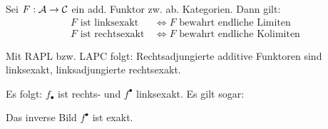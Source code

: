 \documentclass{cheat-sheet}
\begin{document}

\begin{lem}
  Sei $F : \mathcal{A} \to \mathcal{C}$ ein add. Funktor zw. ab. Kategorien. Dann gilt:
  \begin{align*}
    \text{$F$ ist linksexakt} & \, \iff \text{$F$ bewahrt endliche Limiten} \\
    \text{$F$ ist rechtsexakt} & \, \iff \text{$F$ bewahrt endliche Kolimiten}
  \end{align*}
\end{lem}

\begin{kor}
  Mit RAPL bzw. LAPC folgt: Rechtsadjungierte additive Funktoren sind linksexakt, linksadjungierte rechtsexakt.
\end{kor}

\begin{bem}
  Es folgt: $f_\bullet$ ist rechts- und $f^\bullet$ linksexakt. Es gilt sogar:
\end{bem}

\begin{lem}
  Das inverse Bild $f^\bullet$ ist exakt.
\end{lem}



\end{document}
